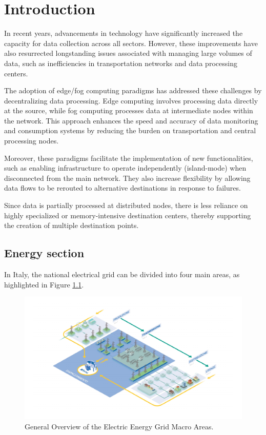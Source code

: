 \chapter{Introduction}
In recent years, advancements in technology have significantly increased the capacity for data collection across all sectors. However, these improvements have also resurrected longstanding issues associated with managing large volumes of data, such as inefficiencies in transportation networks and data processing centers.

The adoption of edge/fog computing paradigms has addressed these challenges by decentralizing data processing. Edge computing involves processing data directly at the source, while fog computing processes data at intermediate nodes within the network. This approach enhances the speed and accuracy of data monitoring and consumption systems by reducing the burden on transportation and central processing nodes.

Moreover, these paradigms facilitate the implementation of new functionalities, such as enabling infrastructure to operate independently (island-mode) when disconnected from the main network. They also increase flexibility by allowing data flows to be rerouted to alternative destinations in response to failures. 

Since data is partially processed at distributed nodes, there is less reliance on highly specialized or memory-intensive destination centers, thereby supporting the creation of multiple destination points.

\section{Energy section}

In Italy, the national electrical grid can be divided into four main areas, as highlighted in Figure \ref{fig:macroaree}.

\begin{figure}[ht]\centering
\includegraphics[scale=0.8]{Pictures/macro-aree}
\caption[General Overview of the Electric Energy Grid Macro Areas]{General Overview of the Electric Energy Grid Macro Areas\footnotemark. }\label{fig:macroaree}
\end{figure}


